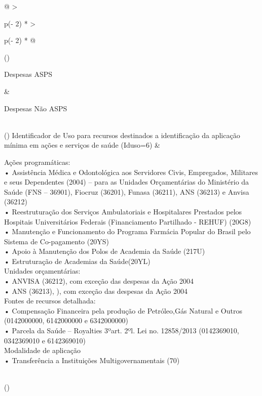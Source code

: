 \documentclass[
  letterpaper,
  DIV=11,
  numbers=noendperiod]{scrartcl}
\begin{document}
\begin{longtable}[]{@{}
  >{\raggedright\arraybackslash}p{(\columnwidth - 2\tabcolsep) * }
  >{\raggedright\arraybackslash}p{(\columnwidth - 2\tabcolsep) * }@{}}
\toprule()
\begin{minipage}[b]{\linewidth}\raggedright
Despesas ASPS
\end{minipage} & \begin{minipage}[b]{\linewidth}\raggedright
Despesas Não ASPS
\end{minipage} \\
\midrule()
\endhead
Identificador de Uso para recursos destinados a identificação da
aplicação mínima em ações e serviços de saúde (Iduso=6) &
\begin{minipage}[t]{\linewidth}\raggedright
Ações programáticas:\\
• Assistência Médica e Odontológica aos Servidores Civis, Empregados,
Militares e seus Dependentes (2004) -- para as Unidades Orçamentárias do
Ministério da Saúde (FNS -- 36901), Fiocruz (36201), Funasa (36211), ANS
(36213) e Anvisa (36212)\\
• Reestruturação dos Serviços Ambulatoriais e Hospitalares Prestados
pelos Hospitais Universitários Federais (Financiamento Partilhado -
REHUF) (20G8)\\
• Manutenção e Funcionamento do Programa Farmácia Popular do Brasil pelo
Sistema de Co-pagamento (20YS)\\
• Apoio à Manutenção dos Polos de Academia da Saúde (217U)\\
• Estruturação de Academias da Saúde(20YL)\\

Unidades orçamentárias:\\
• ANVISA (36212), com exceção das despesas da Ação 2004\\
• ANS (36213), ), com exceção das despesas da Ação 2004\\

Fontes de recursos detalhada:\\
• Compensação Financeira pela produção de Petróleo,Gás Natural e Outros
(0142000000, 6142000000 e 6342000000)\\
• Parcela da Saúde -- Royalties 3ºart. 2ºl. Lei no. 12858/2013
(0142369010, 0342369010 e 6142369010)\\

Modalidade de aplicação\\
• Transferência a Instituições Multigovernamentais (70)\strut
\end{minipage} \\
\bottomrule()
\end{longtable}
\end{document}
